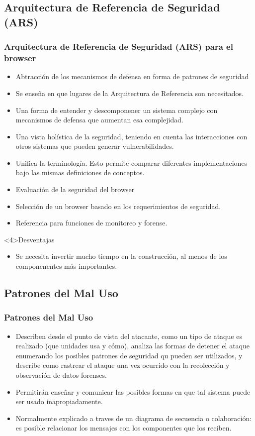 \documentclass[serif,9pt]{beamer}
\begin{document}
\subsection{Arquitectura de Referencia de Seguridad (ARS)}
\begin{frame}
	\frametitle{Arquitectura de Referencia de Seguridad (ARS) para el browser}
	\begin{itemize}
		\item<1> Abtracción de los mecanismos de defensa en forma de patrones de seguridad
		\item<1> Se enseña en que lugares de la Arquitectura de Referencia son necesitados.
		\item<1> Una forma de entender y descomponener un sistema complejo con mecanismos de defensa que aumentan esa complejidad.
		\item<2> Una vista holística de la seguridad, teniendo en cuenta las interacciones con otros sistemas que pueden generar vulnerabilidades.
		\item<2> Unifica la terminología. Esto permite comparar diferentes implementaciones bajo las mismas definiciones de conceptos.
		\item<2> Evaluación de la seguridad del browser
		\item<3> Selección de un browser basado en los requerimientos de seguridad.
		\item<3> Referencia para funciones de monitoreo y forense.
	\end{itemize}
	\begin{block}{Desventajas}
		\begin{itemize}
			\item Se necesita invertir mucho tiempo en la construcción, al menos de los componenentes más importantes.
		\end{itemize}
	\end{block}
\end{frame}

\subsection{Patrones del Mal Uso}
\begin{frame}
	\frametitle{Patrones del Mal Uso}
	\begin{itemize}
		\item Describen desde el punto de vista del atacante, como un tipo de ataque es realizado (que unidades usa y cómo), analiza las formas de detener el ataque enumerando los posibles patrones de seguridad qu pueden ser utilizados, y describe como rastrear el ataque una vez ocurrido con la recolección y observación de datos forenses.
		\item Permitir\'an enseñar y comunicar las posibles formas en que tal sistema puede ser usado inapropiadamente.
		\item Normalmente explicado a traves de un diagrama de secuencia o colaboración: es posible relacionar los mensajes con los componentes que los reciben.
	\end{itemize}
\end{frame}
\end{document}
